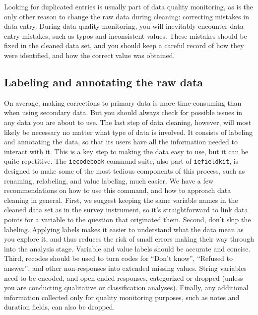 Looking for duplicated entries is usually part of data quality monitoring,
as is the only other reason to change the raw data during cleaning:
correcting mistakes in data entry.
During data quality monitoring, you will inevitably encounter data entry mistakes,
such as typos and inconsistent values.
These mistakes should be fixed in the cleaned data set,
and you should keep a careful record of how they were identified,
and how the correct value was obtained.

\subsection{Labeling and annotating the raw data}

On average, making corrections to primary data is more time-consuming than when using secondary data.
But you should always check for possible issues in any data you are about to use.
The last step of data cleaning, however, 
will most likely be necessary no matter what type of data is involved.
It consists of labeling and annotating the data, 
so that its users have all the information needed to interact with it.
This is a key step to making the data easy to use, but it can be quite repetitive.
The \texttt{iecodebook} command suite, also part of \texttt{iefieldkit},
is designed to make some of the most tedious components of this process,
such as renaming, relabeling, and value labeling, much easier.
We have a few recommendations on how to use this command,
and how to approach data cleaning in general.
First, we suggest keeping the same variable names in the cleaned data set as in the survey instrument, 
so it's straightforward to link data points for a variable to the question that originated them.
Second, don't skip the labeling.
Applying labels makes it easier to understand what the data mean as you explore it,
and thus reduces the risk of small errors making their way through into the analysis stage.
Variable and value labels should be accurate and concise.
Third, recodes should be used to turn codes for ``Don't know'', ``Refused to answer'', and
other non-responses into extended missing values.
String variables need to be encoded, and open-ended responses, categorized or dropped
(unless you are conducting qualitative or classification analyses).
Finally, any additional information collected only for quality monitoring purposes,
such as notes and duration fields, can also be dropped.

